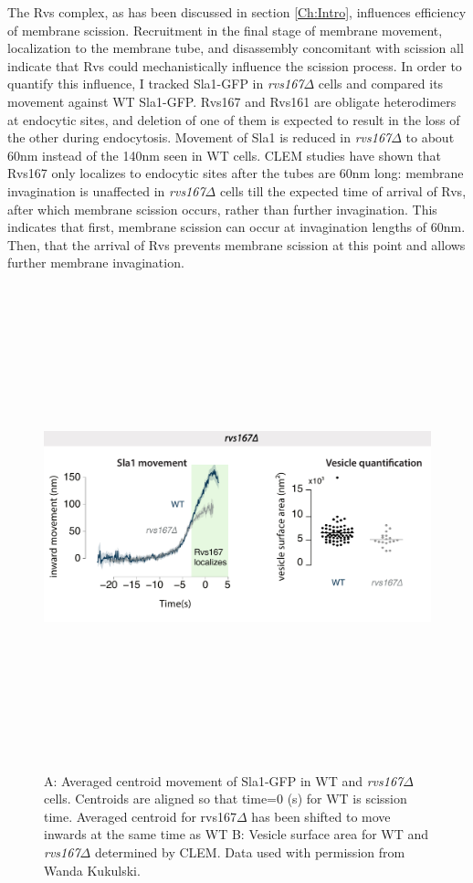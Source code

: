 The Rvs complex, as has been discussed in section \ref{Ch:Intro}, influences efficiency of membrane scission. Recruitment in the final stage of membrane movement, localization to the membrane tube, and  disassembly concomitant with scission all indicate that Rvs could mechanistically influence the scission process. In order to quantify this influence, I tracked Sla1-GFP in \textit{rvs167$\Delta$} cells and compared its movement against WT Sla1-GFP. Rvs167 and Rvs161 are obligate heterodimers at endocytic sites, and deletion of one of them is expected to result in the loss of the other during endocytosis. Movement of Sla1 is reduced in \textit{rvs167$\Delta$} to about 60nm instead of the 140nm seen in WT cells. CLEM studies have shown that Rvs167 only localizes to endocytic sites after the tubes are 60nm long: membrane invagination is unaffected in \textit{rvs167$\Delta$} cells till the expected time of arrival of Rvs, after which membrane scission occurs, rather than further invagination. This indicates that first, membrane scission can occur at invagination lengths of 60nm. Then, that the arrival of Rvs prevents membrane scission at this point and allows further membrane invagination. 

\begin{figure}[h]
	\centering
	\includegraphics[width=14cm,height=14cm,keepaspectratio, valign=t]{figures/results_final/rvsdeletion}
	\caption[some stuff]
	{A: Averaged centroid movement of Sla1-GFP in WT and \textit{rvs167$\Delta$} cells. Centroids are aligned so that time=0 (s) for WT is scission time. Averaged centroid for rvs167$\Delta$ has been shifted to move inwards at the same time as WT B: Vesicle surface area for WT and \textit{rvs167$\Delta$} determined by CLEM. Data used with permission from Wanda Kukulski.
	\label{fig2_rvsdelta}
	}
\end{figure}






